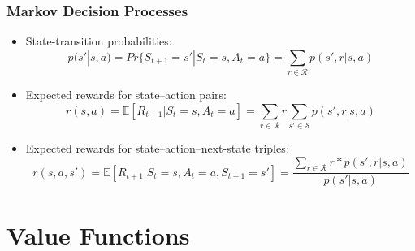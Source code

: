 \documentclass{beamer}
\begin{document}

\begin{frame}
\frametitle{Markov Decision Processes}
\begin{itemize}
\item State-transition probabilities:
\begin{equation}
p(s' | s,a) = Pr\{S_{t+1} = s' | S_t = s, A_t = a\} =  \sum_{r \in \mathscr{R} } p(s',r | s,a)
\nonumber
\end{equation}
\item Expected rewards for state--action pairs:
\begin{equation}
r(s,a) = \mathbb{E}[R_{t+1} | S_t = s, A_t = a] = \sum_{r \in \mathscr{R} } r \sum_{s' \in \mathscr{S} } p(s',r | s,a)
\nonumber
\end{equation}
\item Expected rewards for state--action--next-state triples:
\begin{equation}
r(s,a,s') = \mathbb{E}[R_{t+1} | S_t = s, A_t = a, S_{t+1}  = s'] =  \dfrac{ \sum_{r \in \mathscr{R} } r*p(s',r | s,a)}{p(s'| s,a)}
\nonumber
\end{equation}
\end{itemize}
\end{frame}



\section{Value Functions} %


\end{document}
